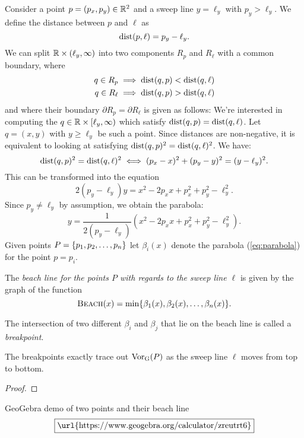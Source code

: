 \newpage
Consider a point $p = (p_x, p_y) \in \mathbb{R}^2$ and a sweep line $y = \ell_y$ with $p_y > \ell_y$. We define the distance between $p$ and $\ell$ as
\[
    \operatorname{dist}(p, \ell) = p_y - \ell_y.
\]
We can split $\mathbb{R} \times (\ell_y, \infty)$ into two components $R_p$ and $R_{\ell}$ with a common boundary, where
\begin{align*}
    q \in R_p &\implies \operatorname{dist}(q, p) < \operatorname{dist}(q, \ell) \\ 
    q \in R_\ell &\implies \operatorname{dist}(q, p) > \operatorname{dist}(q, \ell)
\end{align*}
and where their boundary $\partial R_p = \partial R_\ell$ is given as follows: We're interested in computing the $q \in \mathbb{R} \times [\ell_y, \infty)$ which satisfy $\operatorname{dist}(q, p) = \operatorname{dist}(q, \ell)$. Let $q = (x, y)$ with $y \geq \ell_y$ be such a point. Since distances are non-negative, it is equivalent to looking at satisfying $\operatorname{dist}(q, p)^2 = \operatorname{dist}(q, \ell)^2$. We have:
\[
    \operatorname{dist}(q, p)^2 = \operatorname{dist}(q, \ell)^2 \iff (p_x - x)^2 + (p_y - y)^2 = (y - \ell_y)^2.
\]
This can be transformed into the equation
\begin{equation}
    2 (p_y - \ell_y) y = x^2 - 2 p_x x + p_x^2 + p_y^2 - \ell_y^2.
\end{equation}
Since $p_y \ne \ell_y$ by assumption, we obtain the parabola:
\begin{equation} \label{eq:parabola}
    y = \frac{1}{2 (p_y - \ell_y)} (x^2 - 2 p_x x + p_x^2 + p_y^2 - \ell_y^2).
\end{equation}
Given points $P = \{p_1, p_2, \ldots, p_n\}$ let $\beta_i(x)$ denote the parabola (\ref{eq:parabola}) for the point $p = p_i$.

\begin{defn}
The \emph{beach line for the points $P$ with regards to the sweep line $\ell$} is given by the graph of the function
\[
    \textsc{Beach}(x) = \min\{\beta_1(x), \beta_2(x), \ldots, \beta_n(x)\}.
\]
\end{defn}

\begin{defn}[Breakpoint]
The intersection of two different $\beta_i$ and $\beta_j$ that lie on the beach line is called a \emph{breakpoint}.
\end{defn}

\begin{thm}
The breakpoints exactly trace out $\operatorname{Vor_{G}}(P)$ as the sweep line $\ell$ moves from top to bottom.
\end{thm}
\begin{proof}
\end{proof}

GeoGebra demo of two points and their beach line
\[
    \boxed{\text{\url{https://www.geogebra.org/calculator/zreutrt6}}}
\]